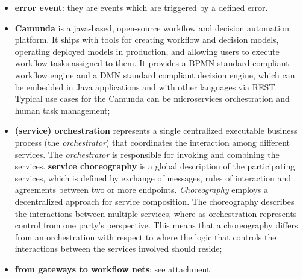 \documentclass[oneside]{article}
\begin{document}
\begin{itemize}
    \item \textbf{error event}: they are events which are triggered by a defined error.
    
    \item \textbf{Camunda} is a java-based, open-source workflow and decision automation platform. It ships with tools for creating workflow and decision models, operating deployed models in production, and allowing users to execute workflow tasks assigned to them. It provides a BPMN standard compliant workflow engine and a DMN standard compliant decision engine, which can be embedded in Java applications and with other languages via REST. Typical use cases for the Camunda can be microservices orchestration and human task management;
    
    \item \textbf{(service) orchestration} represents a single centralized executable business process (the \textit{orchestrator}) that coordinates the interaction among different services. The \textit{orchestrator} is responsible for invoking and combining the services. \newline
    \textbf{service choreography} is a global description of the participating services, which is defined by exchange of messages, rules of interaction and agreements between two or more endpoints. \textit{Choreography} employs a decentralized approach for service composition. \newline
    The choreography describes the interactions between multiple services, where as orchestration represents control from one party's perspective. This means that a choreography differs from an orchestration with respect to where the logic that controls the interactions between the services involved should reside;
    
    \item \textbf{from gateways to workflow nets}: see attachment
\end{itemize}


\end{document}
